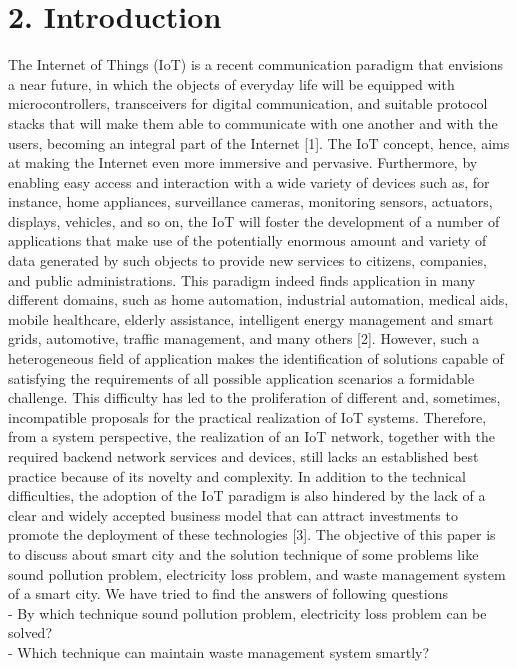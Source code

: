 \documentclass[a4paper]{report}
\begin{document}
	\section*{2. Introduction}
	The Internet of Things (IoT) is a recent communication paradigm that envisions a near future, in which the objects of everyday life will be equipped with microcontrollers, transceivers for digital communication, and suitable protocol stacks that will make them able to communicate with one another and with the users, becoming an integral part of the Internet [1]. The IoT concept, hence, aims at making the Internet even more immersive and pervasive. Furthermore, by enabling easy access and interaction with a wide variety of devices such as, for instance, home appliances, surveillance cameras, monitoring sensors, actuators, displays, vehicles, and so on, the IoT will foster the development of a number of applications that make use of the potentially enormous amount and variety of data generated by such objects to provide new services to citizens, companies, and public administrations. This paradigm indeed finds application in many different domains, such as home automation, industrial automation, medical aids, mobile healthcare, elderly assistance, intelligent energy management and smart grids, automotive, traffic management, and many others [2].
	However, such a heterogeneous field of application makes the
	identification of solutions capable of satisfying the requirements
	of all possible application scenarios a formidable challenge. This
	difficulty has led to the proliferation of different and, sometimes, incompatible proposals for the practical realization of IoT systems. Therefore, from a system perspective, the realization of an IoT network, together with the required backend network services and devices, still lacks an established best practice because of its novelty and complexity. In addition to the technical
	difficulties, the adoption of the IoT paradigm is also hindered
	by the lack of a clear and widely accepted business model that
	can attract investments to promote the deployment of these
	technologies [3].
	The objective of this paper is to discuss about smart city and the solution technique of some problems like sound pollution problem, electricity loss problem, and waste management system of a smart city. We have tried to find the answers of following questions \\
	- By which technique sound pollution problem, electricity loss problem can be solved?\\
	- Which technique can maintain waste management system smartly?
	
\end{document}
